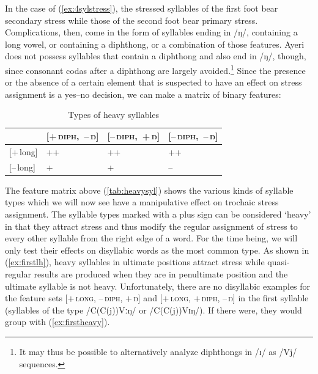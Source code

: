 In the case of (\ref{ex:4sylstress}), the stressed syllables of the first foot
bear secondary stress while those of the second foot bear primary stress.
Complications, then, come in the form of syllables ending in /ŋ/, containing a
long vowel, or containing a diphthong, or a combination of those features.
Ayeri does not possess syllables that contain a diphthong and
also end in /ŋ/, though, since consonant codas after a diphthong are largely
avoided.\footnote{It may thus be possible to alternatively analyze diphthongs
in /ɪ/ as /Vj/ sequences.} Since the presence or the absence of a certain
element that is suspected to have an effect on stress assignment is a yes--no
decision, we can make a matrix of binary features:

\begin{table}[h]\centering
\caption{Types of heavy syllables}
\scshape
\begin{tabu} to .75\linewidth {B X[c] X[c] X[c]}
\tableheaderfont\toprule

	& \mbox{\textsc{[+\,diph,~–\,ŋ]}}
	& \mbox{\textsc{[–\,diph,~+\,ŋ]}}
	& \mbox{\textsc{[–\,diph,~–\,ŋ]}}
	\\
	
\toprule

[+\,long]
	& ++
	& ++
	& ++
	\\

[–\,long]
	& +
	& +
	& –
	\\

\bottomrule
\end{tabu}
\label{tab:heavysyl}
\end{table}

The feature matrix above (\autoref{tab:heavysyl}) shows the various kinds of
syllable types which we will now see have a manipulative effect on trochaic
stress assignment. The syllable types marked with a plus sign can be considered
`heavy' in that they attract stress and thus modify the regular assignment of
stress to every other syllable from the right edge of a word. For the time
being, we will only test their effects on disyllabic words as the most common
type. As shown in (\ref{ex:firstlh}), heavy syllables in ultimate positions
attract stress while quasi-regular results are produced when they are in
penultimate position and the ultimate syllable is not heavy. Unfortunately,
there are no disyllabic examples for the feature sets \textsc{[+\,long,
\mbox{–\,diph,} +\,ŋ]} and \textsc{[+\,long, +\,diph, –\,ŋ]} in the first
syllable (syllables of the type /C(C(j))Vːŋ/ or /C(C(j))Vɪŋ/). If there were,
they would group with (\ref{ex:firstheavy}).

